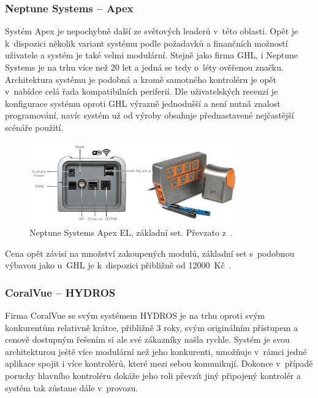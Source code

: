             
        \subsubsection{Neptune Systems -- Apex}
            Systém Apex je nepochybně další ze světových leaderů v~této oblasti. Opět je k~dispozici několik variant systému podle požadavků a finančních možností uživatele a systém je také velmi modulární. Stejně jako firma GHL, i Neptune Systems je na trhu více než 20 let a jedná se tedy o~léty ověřenou značku. Architektura systému je podobná a kromě samotného kontroléru je opět v~nabídce celá řada kompatibilních periferií. Dle uživatelských recenzí je konfigurace systému oproti GHL výrazně jednodušší a není nutná znalost programování, navíc systém už od výroby obsahuje přednastavené nejčastější scénáře použití.

            \begin{figure}[h!]
                \centering
                \includegraphics[width=0.8\textwidth]{obrazky/trh/apex-el.jpg}
                \caption{Neptune Systems Apex EL, základní set. Převzato z~\cite{eshop-neptune-systems-apex}.}
                \label{fig:obrazky-trh-apex-el}
            \end{figure}
            
            Cena opět závisí na množství zakoupených modulů, základní set s~podobnou výbavou jako u~GHL je k~dispozici přibližně od \qty{12000}{Kč}~\cite{neptune-systems-why-apex,eshop-neptune-systems-apex}.

        \subsubsection{CoralVue -- HYDROS}
            Firma CoralVue se svým systémem HYDROS je na trhu oproti svým konkurentům relativně krátce, přibližně 3 roky, svým originálním přístupem a cenově dostupným řešením si ale své zákazníky našla rychle. Systém je svou architekturou ještě více modulární než jeho konkurenti, umožňuje v~rámci jedné aplikace spojit i více kontrolérů, které mezi sebou komunikují. Dokonce v~případě poruchy hlavního kontroléru dokáže jeho roli převzít jiný připojený kontrolér a systém tak zůstane dále v~provozu. 
            
